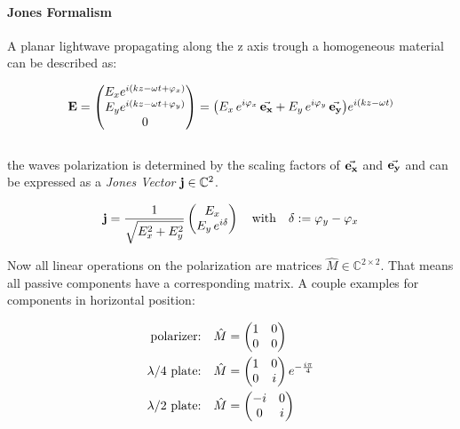 \paragraph{Jones Formalism}
 A planar lightwave propagating along the z axis trough a homogeneous material can be described as:

\begin{equation}
    \vb E =
    \begin{pmatrix}
        E_x e^{i(kz - \omega t + \varphi_x)}\\
        E_y e^{i(kz - \omega t + \varphi_y)}\\
        0\\
    \end{pmatrix}
    =
    \qty(E_x \, e^{i \varphi_x} \, \va{e_x} +
         E_y \, e^{i \varphi_y} \, \va{e_y})
        e^{i(kz - \omega t)}
\end{equation}
\\

\noindent
the waves polarization is determined by the scaling factors of $\va{e_x}$ and $\va{e_y}$ and can be expressed as a \textit{Jones Vector} $\vb j \in \mathbb{C}^2$.

\begin{equation}
    \vb j = \frac{1}{\sqrt{E_x^2 + E_y^2}}
    \begin{pmatrix}
        E_x\\
        E_y \, e^{i \delta}
    \end{pmatrix}
    \qq{with}
    \delta := \varphi_y - \varphi_x
\end{equation}

\noindent
Now all linear operations on the polarization are matrices $\hat{M} \in \mathbb{C}^{2 \times 2}$. That means all passive components have a corresponding matrix. A couple examples for components in horizontal position:


\begin{equation}
\begin{split}
    \qq*{polarizer:} \hat{M} &=
    \begin{pmatrix}
        1 & 0\\
        0 & 0
    \end{pmatrix}\\
    \qq*{$\lambda / 4$ plate:} \hat{M} &=
    \begin{pmatrix}
        1 & 0\\
        0 & i
    \end{pmatrix}
    e^{-\frac{i \pi}{4}}\\
    \qq*{$\lambda / 2$ plate:} \hat{M} &=
    \begin{pmatrix}
        -i & 0\\
        0 & i
    \end{pmatrix}\\
\end{split}
\end{equation}

